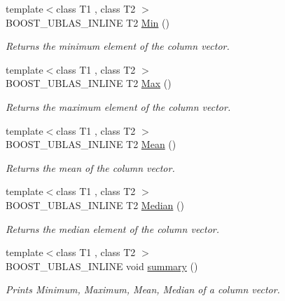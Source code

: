 \begin{DoxyCompactItemize}
{\footnotesize template$<$class T1 , class T2 $>$ }\\B\+O\+O\+S\+T\+\_\+\+U\+B\+L\+A\+S\+\_\+\+I\+N\+L\+I\+NE T2 \hyperlink{classboost_1_1numeric_1_1ublas_1_1df__column_aaa29e332cec5a5295f58a2e8ea6607b7}{Min} ()
\begin{DoxyCompactList}\small\item\em Returns the minimum element of the column vector. \end{DoxyCompactList}\item 
{\footnotesize template$<$class T1 , class T2 $>$ }\\B\+O\+O\+S\+T\+\_\+\+U\+B\+L\+A\+S\+\_\+\+I\+N\+L\+I\+NE T2 \hyperlink{classboost_1_1numeric_1_1ublas_1_1df__column_a92473d4054d19c440ddc4460c33f3ca7}{Max} ()
\begin{DoxyCompactList}\small\item\em Returns the maximum element of the column vector. \end{DoxyCompactList}\item 
{\footnotesize template$<$class T1 , class T2 $>$ }\\B\+O\+O\+S\+T\+\_\+\+U\+B\+L\+A\+S\+\_\+\+I\+N\+L\+I\+NE T2 \hyperlink{classboost_1_1numeric_1_1ublas_1_1df__column_acb45cd583cbf683ba1a17ad184a3a04e}{Mean} ()
\begin{DoxyCompactList}\small\item\em Returns the mean of the column vector. \end{DoxyCompactList}\item 
{\footnotesize template$<$class T1 , class T2 $>$ }\\B\+O\+O\+S\+T\+\_\+\+U\+B\+L\+A\+S\+\_\+\+I\+N\+L\+I\+NE T2 \hyperlink{classboost_1_1numeric_1_1ublas_1_1df__column_a6b133f7f21e72bc7be09e0c3b67c3047}{Median} ()
\begin{DoxyCompactList}\small\item\em Returns the median element of the column vector. \end{DoxyCompactList}\item 
{\footnotesize template$<$class T1 , class T2 $>$ }\\B\+O\+O\+S\+T\+\_\+\+U\+B\+L\+A\+S\+\_\+\+I\+N\+L\+I\+NE void \hyperlink{classboost_1_1numeric_1_1ublas_1_1df__column_a76ff5a8f71399f09dc85731314230de7}{summary} ()
\begin{DoxyCompactList}\small\item\em Prints Minimum, Maximum, Mean, Median of a column vector. \end{DoxyCompactList}\end{DoxyCompactItemize}
